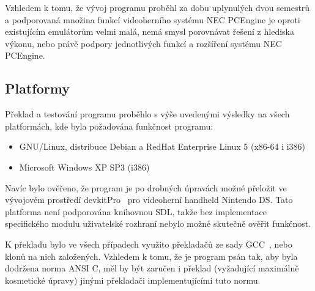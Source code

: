 Vzhledem k tomu, že vývoj programu proběhl za dobu uplynulých dvou semestrů a
podporovaná množina funkcí videoherního systému NEC PCEngine je oproti
existujícím emulátorům velmi malá, nemá smysl porovnávat řešení z hlediska
výkonu, nebo právě podpory jednotlivých funkcí a rozšíření systému NEC PCEngine.

%
%

\subsection{Platformy}

Překlad a testování programu proběhlo s výše uvedenými výsledky na všech
platformách, kde byla požadována funkčnost programu:

\begin{itemize}
\item GNU/Linux, distribuce Debian a RedHat Enterprise Linux 5 (x86-64 i i386)
\item Microsoft Windows XP SP3 (i386)
\end{itemize}

Navíc bylo ověřeno, že program je po drobných úpravách možné přeložit ve
vývojovém prostředí devkitPro~\cite{wwwDevkitPro} pro videoherní handheld
Nintendo DS. Tato platforma není podporována knihovnou SDL, takže bez
implementace specifického modulu uživatelské rozhraní nebylo možné skutečně
ověřit funkčnost.

K překladu bylo ve všech případech využito překladačů ze sady
GCC~\cite{wwwGCC}, nebo klonů na nich založených. Vzhledem k tomu, že je
program psán tak, aby byla dodržena norma ANSI C, měl by být zaručen i překlad
(vyžadující maximálně kosmetické úpravy) jinými překladači implementujícími
tuto normu.
